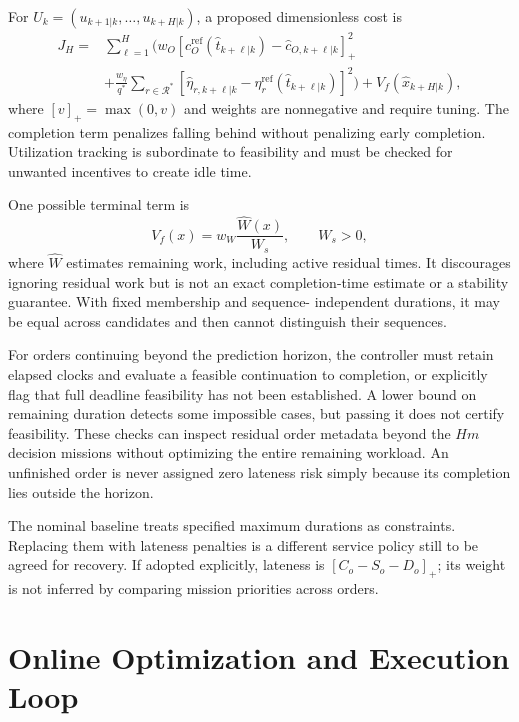 For $U_k=(u_{k+1|k},\ldots,u_{k+H|k})$, a proposed dimensionless cost is
\begin{align}
 J_H={}&\sum_{\ell=1}^H\Bigg(
 w_O\left[c_O^{\mathrm{ref}}(\widehat t_{k+\ell|k})
 -\widehat c_{O,k+\ell|k}\right]_+^2\nonumber\\
 &+\frac{w_\eta}{q^*}\sum_{r\in\mathcal R^*}
 \left[\widehat\eta_{r,k+\ell|k}
 -\eta_r^{\mathrm{ref}}(\widehat t_{k+\ell|k})\right]^2\Bigg)
 +V_f(\widehat x_{k+H|k}),
\end{align}
where $[v]_+=\max(0,v)$ and weights are nonnegative and require tuning.
The completion term penalizes falling behind without penalizing early
completion. Utilization tracking is subordinate to feasibility and must be
checked for unwanted incentives to create idle time.

One possible terminal term is
\begin{equation}
 V_f(x)=w_W\frac{\widehat W(x)}{W_s},\qquad W_s>0,
\end{equation}
where $\widehat W$ estimates remaining work, including active residual times.
It discourages ignoring residual work but is not an exact completion-time
estimate or a stability guarantee. With fixed membership and sequence-
independent durations, it may be equal across candidates and then cannot
distinguish their sequences.

For orders continuing beyond the prediction horizon, the controller must
retain elapsed clocks and evaluate a feasible continuation to completion,
or explicitly flag that full deadline feasibility has not been established.
A lower bound on remaining duration detects some impossible cases, but
passing it does not certify feasibility. These checks can inspect residual
order metadata beyond the $Hm$ decision missions without optimizing the
entire remaining workload. An unfinished order is never assigned zero
lateness risk simply because its completion lies outside the horizon.

The nominal baseline treats specified maximum durations as constraints.
Replacing them with lateness penalties is a different service policy still
to be agreed for recovery. If adopted explicitly, lateness is
$[C_o-S_o-D_o]_+$; its weight is not inferred by comparing mission priorities
across orders.

\section{Online Optimization and Execution Loop}

